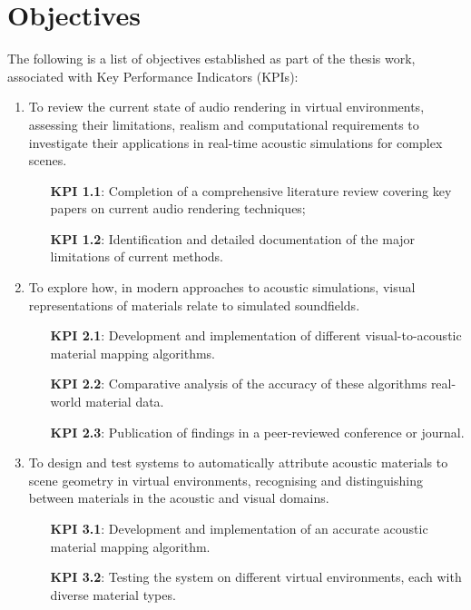 \section{Objectives}\label{sec:thesis-objectives}
The following is a list of objectives established as part of the thesis work, associated with Key Performance Indicators (KPIs):
\begin{enumerate}
    \item To review the current state of audio rendering in virtual environments, assessing their limitations, realism and computational requirements to investigate their applications in real-time acoustic simulations for complex scenes.
        \begin{itemize}
            \item[\textbf{KPI 1.1}:] Completion of a comprehensive literature review covering key papers on current audio rendering techniques;
            \item[\textbf{KPI 1.2}:] Identification and detailed documentation of the major limitations of current methods.
        \end{itemize}
    \item To explore how, in modern approaches to acoustic simulations, visual representations of materials relate to simulated soundfields.
        \begin{itemize}
            \item[\textbf{KPI 2.1}:] Development and implementation of different visual-to-acoustic material mapping algorithms.
            \item[\textbf{KPI 2.2}:] Comparative analysis of the accuracy of these algorithms real-world material data.
            \item[\textbf{KPI 2.3}:] Publication of findings in a peer-reviewed conference or journal.
        \end{itemize}
    \item To design and test systems to automatically attribute acoustic materials to scene geometry in virtual environments, recognising and distinguishing between materials in the acoustic and visual domains.
        \begin{itemize}
            \item[\textbf{KPI 3.1}:] Development and implementation of an accurate acoustic material mapping algorithm.
            \item[\textbf{KPI 3.2}:] Testing the system on different virtual environments, each with diverse material types.
        \end{itemize}

\end{enumerate}
